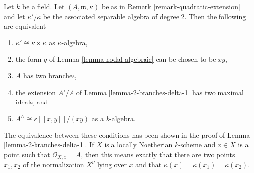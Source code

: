 \begin{remark}
\label{remark-trivial-quadratic-extension}
Let $k$ be a field. Let $(A, \mathfrak m, \kappa)$ be as in
Remark \ref{remark-quadratic-extension} and let $\kappa'/\kappa$
be the associated separable algebra of degree $2$.
Then the following are equivalent
\begin{enumerate}
\item $\kappa' \cong \kappa \times \kappa$ as $\kappa$-algebra,
\item the form $q$ of Lemma \ref{lemma-nodal-algebraic}
can be chosen to be $xy$,
\item $A$ has two branches,
\item the extension $A'/A$ of Lemma \ref{lemma-2-branches-delta-1}
has two maximal ideals, and
\item $A^\wedge \cong \kappa[[x, y]]/(xy)$ as a $k$-algebra.
\end{enumerate}
The equivalence between these conditions has been shown in the
proof of Lemma \ref{lemma-2-branches-delta-1}. If $X$ is a
locally Noetherian $k$-scheme and $x \in X$ is a point such that
$\mathcal{O}_{X, x} = A$, then this means exactly that
there are two points $x_1, x_2$ of the normalization $X^\nu$
lying over $x$ and that $\kappa(x) = \kappa(x_1) = \kappa(x_2)$.
\end{remark}